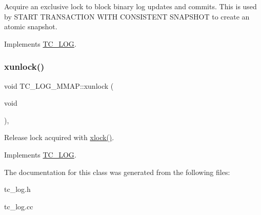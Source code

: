 Acquire an exclusive lock to block binary log updates and commits. This is used by S\+T\+A\+RT T\+R\+A\+N\+S\+A\+C\+T\+I\+ON W\+I\+TH C\+O\+N\+S\+I\+S\+T\+E\+NT S\+N\+A\+P\+S\+H\+OT to create an atomic snapshot. 

Implements \mbox{\hyperlink{classTC__LOG_aac75dc061e9aae27449e675b23c27ae3}{T\+C\+\_\+\+L\+OG}}.

\mbox{\label{classTC__LOG__MMAP_a728d9b1b03c73850ba116b93677a42a8}} 
\subsubsection{\texorpdfstring{xunlock()}{xunlock()}}
{\footnotesize\ttfamily void T\+C\+\_\+\+L\+O\+G\+\_\+\+M\+M\+A\+P\+::xunlock (\begin{DoxyParamCaption}\item[{void}]{ }\end{DoxyParamCaption})\hspace{0.3cm}{\ttfamily [inline]}, {\ttfamily [virtual]}}

Release lock acquired with \mbox{\hyperlink{classTC__LOG__MMAP_ab6e8fad0d9b8167b22d22f4372739202}{xlock()}}. 

Implements \mbox{\hyperlink{classTC__LOG_a60ee380273adc9e23c56ff114cd2636a}{T\+C\+\_\+\+L\+OG}}.



The documentation for this class was generated from the following files\+:\begin{DoxyCompactItemize}
\item 
tc\+\_\+log.\+h\item 
tc\+\_\+log.\+cc\end{DoxyCompactItemize}
